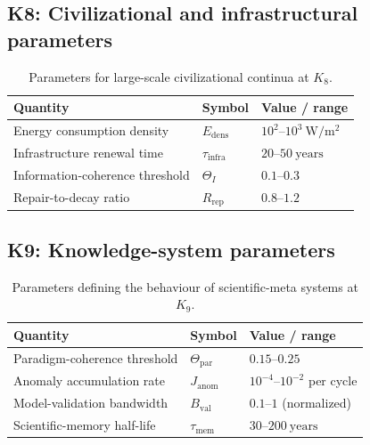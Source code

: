 
\subsection*{K8: Civilizational and infrastructural parameters}

\begin{table}[h]
  \centering
  \caption{Parameters for large-scale civilizational continua at \(K_8\).}
  \label{tab:k8-civilizational-parameters}
  \begin{tabular}{lll}
    \hline
    Quantity & Symbol & Value / range \\
    \hline
    Energy consumption density & \(E_\mathrm{dens}\)
        & \(10^2\text{–}10^3~\mathrm{W/m^2}\) \\
    Infrastructure renewal time & \(\tau_\mathrm{infra}\)
        & \(20\text{–}50~\mathrm{years}\) \\
    Information-coherence threshold & \(\Theta_I\)
        & \(0.1\text{–}0.3\) \\
    Repair-to-decay ratio & \(R_\mathrm{rep}\)
        & \(0.8\text{–}1.2\) \\
    \hline
  \end{tabular}
\end{table}


\subsection*{K9: Knowledge-system parameters}

\begin{table}[h]
  \centering
  \caption{Parameters defining the behaviour of scientific-meta systems at \(K_9\).}
  \label{tab:k9-knowledge-parameters}
  \begin{tabular}{lll}
    \hline
    Quantity & Symbol & Value / range \\
    \hline
    Paradigm-coherence threshold & \(\Theta_{\mathrm{par}}\)
        & \(0.15\text{–}0.25\) \\
    Anomaly accumulation rate & \(J_\mathrm{anom}\)
        & \(10^{-4}\text{–}10^{-2}\) per cycle \\
    Model-validation bandwidth & \(B_\mathrm{val}\)
        & \(0.1\text{–}1\) (normalized) \\
    Scientific-memory half-life & \(\tau_\mathrm{mem}\)
        & \(30\text{–}200~\mathrm{years}\) \\
    \hline
  \end{tabular}
\end{table}

